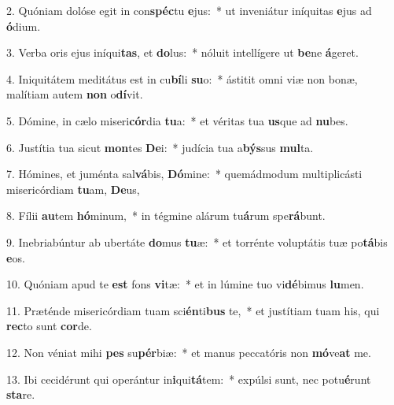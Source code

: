 2. Quóniam dolóse egit in con\textbf{spéc}tu \textbf{e}jus:~*  ut inveniátur iníquitas \textbf{e}jus ad \textbf{ó}dium.\

3. Verba oris ejus iníqui\textbf{tas}, et \textbf{do}lus:~*  nóluit intellígere ut \textbf{be}ne \textbf{á}geret.\

4. Iniquitátem meditátus est in cu\textbf{bí}li \textbf{su}o:~*  ástitit omni viæ non bonæ, malítiam autem \textbf{non} o\textbf{dí}vit.\

5. Dómine, in cælo miseri\textbf{cór}dia \textbf{tu}a:~*  et véritas tua \textbf{us}que ad \textbf{nu}bes.\

6. Justítia tua sicut \textbf{mon}tes \textbf{De}i:~*  judícia tua a\textbf{býs}sus \textbf{mul}ta.\

7. Hómines, et juménta sal\textbf{vá}bis, \textbf{Dó}mine:~*  quemádmodum multiplicásti misericórdiam \textbf{tu}am, \textbf{De}us,\

8. Fílii \textbf{au}tem \textbf{hó}minum,~*  in tégmine alárum tu\textbf{á}rum spe\textbf{rá}bunt.\

9. Inebriabúntur ab ubertáte \textbf{do}mus \textbf{tu}æ:~*  et torrénte voluptátis tuæ po\textbf{tá}bis \textbf{e}os.\

10. Quóniam apud te \textbf{est} fons \textbf{vi}tæ:~*  et in lúmine tuo vi\textbf{dé}bimus \textbf{lu}men.\

11. Præténde misericórdiam tuam sci\textbf{én}ti\textbf{bus} te,~*  et justítiam tuam his, qui \textbf{rec}to sunt \textbf{cor}de.\

12. Non véniat mihi \textbf{pes} su\textbf{pér}biæ:~*  et manus peccatóris non \textbf{mó}ve\textbf{at} me.\

13. Ibi cecidérunt qui operántur in\textbf{i}qui\textbf{tá}tem:~*  expúlsi sunt, nec potu\textbf{é}runt \textbf{sta}re.\

